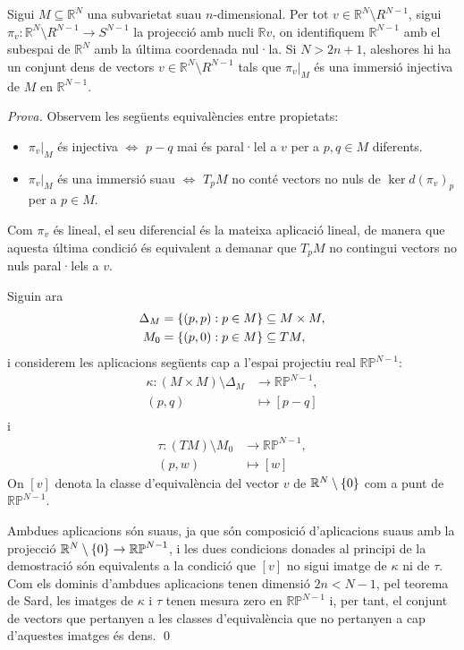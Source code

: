 \begin{lema}
    Sigui $M\subseteq\mathbb R^N$ una subvarietat suau $n$-dimensional. Per tot $v\in \mathbb R^N\setminus R^{N-1}$, sigui $\pi_v : \mathbb R^N\setminus R^{N-1}\to S^{N-1}$ la projecció amb nucli $\mathbb Rv$, on identifiquem $\mathbb R^{N-1}$ amb el subespai de $\mathbb R^N$ amb la última coordenada nul·la. Si $N>2n+1$, aleshores hi ha un conjunt dens de vectors $v\in \mathbb R^N\setminus R^{N-1}$ tals que $\pi_v|_M$ és una immersió injectiva de $M$ en $\mathbb R^{N-1}$.
\end{lema}
{
    \color{green!50!black} 
    \textit{Prova.}
    Observem les següents equivalències entre propietats:
    \begin{itemize}
        \item $\pi_v|_M$ és injectiva $\iff$ $p-q$ mai és paral·lel a $v$ per a $p,q\in M$ diferents.
        \item $\pi_v|_M$ és una immersió suau $\iff$ $T_pM$ no conté vectors no nuls de $\ker d(\pi_v)_p$ per a $p\in M$.
    \end{itemize}
    Com $\pi_v$ és lineal, el seu diferencial és la mateixa aplicació lineal, de manera que aquesta última condició és equivalent a demanar que $T_pM$ no contingui vectors no nuls paral·lels a $v$.

    Siguin ara
    \begin{align*}
        \Delta_M &= \{(p,p):p\in M\}\subseteq M\times M,\\
        M_0 &= \{(p,0):p\in M\}\subseteq TM,\\
    \end{align*}
    i considerem les aplicacions següents cap a l'espai projectiu real $\mathbb {RP}^{N-1}$:
    \begin{align*}
        \kappa:(M\times M)\setminus\Delta_M&\to\mathbb {RP}^{N-1},\\
        (p,q) &\mapsto [p-q]\\
    \end{align*}
    i
    \begin{align*}
        \tau:(TM)\setminus M_0&\to\mathbb {RP}^{N-1},\\
        (p,w) &\mapsto [w]
    \end{align*}
    On $[v]$ denota la classe d'equivalència del vector $v$ de $\mathbb R^N\setminus\{0\}$ com a punt de $\mathbb {RP}^{N-1}$.

    Ambdues aplicacions són suaus, ja que són composició d'aplicacions suaus amb la projecció $\mathbb R^N\setminus\{0\}\to\mathbb {RP}^{N-1}$, i les dues condicions donades al principi de la demostració són equivalents a la condició que $[v]$ no sigui imatge de $\kappa$ ni de $\tau$. Com els dominis d'ambdues aplicacions tenen dimensió $2n<N-1$, pel teorema de Sard, les imatges de $\kappa$ i $\tau$ tenen mesura zero en $\mathbb {RP}^{N-1}$ i, per tant, el conjunt de vectors que pertanyen a les classes d'equivalència que no pertanyen a cap d'aquestes imatges és dens.
    \qed
}

